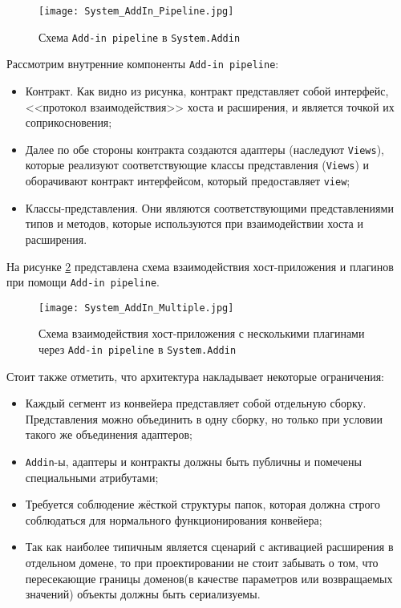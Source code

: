 \begin{figure}[!h]
    \centering
    \texttt{[image: System\_AddIn\_Pipeline.jpg]}
    \caption{Схема {\tt Add-in pipeline} в {\tt System.Addin}}
    \label{addin_pipeline-scheme}
\end{figure}

Рассмотрим внутренние компоненты {\tt Add-in pipeline}:

\begin{itemize}

  \item Контракт. Как видно из рисунка, контракт представляет собой интерфейс, <<протокол взаимодействия>> хоста и расширения, и является точкой их соприкосновения;

  \item Далее по обе стороны контракта создаются адаптеры (наследуют {\tt Views}), которые реализуют соответствующие классы представления ({\tt Views}) и оборачивают контракт интерфейсом, который предоставляет {\tt view};

  \item Классы-представления. Они являются соответствующими представлениями типов и методов, которые используются при взаимодействии хоста и расширения.

\end{itemize}

На рисунке \ref{addin_multiple-scheme} представлена схема взаимодействия хост-приложения и плагинов при помощи {\tt Add-in pipeline}.

\begin{figure}[!h]
    \centering
    \texttt{[image: System\_AddIn\_Multiple.jpg]}
    \caption{Схема взаимодействия хост-приложения с несколькими плагинами через {\tt Add-in pipeline} в {\tt System.Addin}}
    \label{addin_multiple-scheme}
\end{figure}

Стоит также отметить, что архитектура накладывает некоторые ограничения:
\begin{itemize}

  \item Каждый сегмент из конвейера представляет собой отдельную сборку. Представления можно объединить в одну сборку, но только при условии такого же объединения адаптеров;

  \item {\tt Addin}-ы, адаптеры и контракты должны быть публичны и помечены специальными атрибутами;

  \item Требуется соблюдение жёсткой структуры папок, которая должна строго соблюдаться для нормального функционирования конвейера;

  \item Так как наиболее типичным является сценарий с активацией расширения в отдельном домене, то при проектировании не стоит забывать о том, что пересекающие границы доменов(в качестве параметров или возвращаемых значений) объекты должны быть сериализуемы.

\end{itemize}
